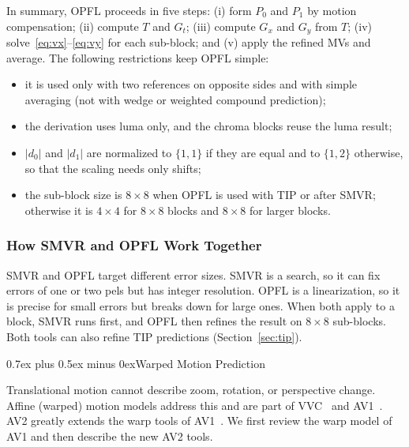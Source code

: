 \documentclass[journal]{IEEEtran}
\makeatletter
\def\subsection{\@startsection{subsection}{2}{\z@}{2.5ex plus 1ex minus 1ex}%
{0.7ex plus 0.5ex minus 0ex}{\normalfont\normalsize\itshape}}%
\makeatother
\begin{document}
In summary, OPFL proceeds in five steps: (i) form $P_0$ and $P_1$ by motion
compensation; (ii) compute $T$ and $G_t$; (iii) compute $G_x$ and $G_y$ from
$T$; (iv) solve~\eqref{eq:vx}--\eqref{eq:vy} for each sub-block; and (v)
apply the refined MVs and average. The following restrictions keep OPFL
simple:
\begin{itemize}
  \item it is used only with two references on opposite sides and with simple
        averaging (not with wedge or weighted compound prediction);
  \item the derivation uses luma only, and the chroma blocks reuse the
        luma result;
  \item $|d_0|$ and $|d_1|$ are normalized to $\{1,1\}$ if they are equal and
        to $\{1,2\}$ otherwise, so that the scaling needs only shifts;
  \item the sub-block size is $8{\times}8$ when OPFL is used with TIP or after
        SMVR; otherwise it is $4{\times}4$ for $8{\times}8$ blocks and
        $8{\times}8$ for larger blocks.
\end{itemize}

\subsubsection{How SMVR and OPFL Work Together}
SMVR and OPFL target different error sizes. SMVR is a search, so it can fix
errors of one or two pels but has integer resolution. OPFL is a linearization,
so it is precise for small errors but breaks down for large ones. When both
apply to a block, SMVR runs first, and OPFL then refines the result on
$8{\times}8$ sub-blocks. Both tools can also refine TIP predictions
(Section~\ref{sec:tip}).

\subsection{Warped Motion Prediction}
\label{sec:warp}

Translational motion cannot describe zoom, rotation, or perspective change.
Affine (warped) motion models address this and are part of VVC~\cite{affine_4param,vvc_subblock}
and AV1~\cite{warp-motion}. AV2 greatly extends the warp tools of
AV1~\cite{av2warp_companion,warp_beyond_av1}. We first review the warp model
of AV1 and then describe the new AV2 tools.
\end{document}
